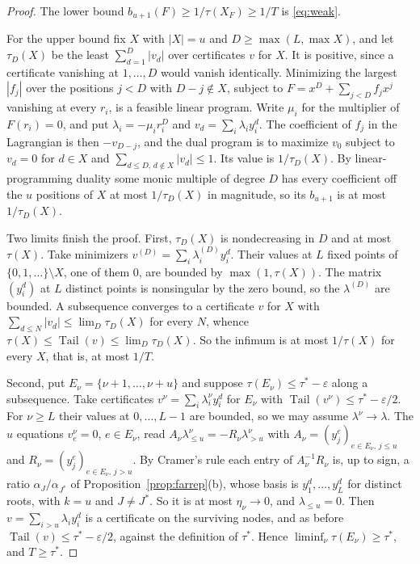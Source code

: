 \documentclass[11pt]{article}
\theoremstyle{definition}
\theoremstyle{plain}
\DeclareMathOperator{\Tail}{Tail}
\begin{document}
\begin{proof}
The lower bound $b_{u+1}(F)\ge1/\tau(X_F)\ge1/T$ is \eqref{eq:weak}.

For the upper bound fix $X$ with $|X|=u$ and $D\ge\max(L,\max X)$, and let
$\tau_D(X)$ be the least $\sum_{d=1}^D|v_d|$ over certificates $v$ for $X$.
It is positive, since a certificate vanishing at $1,\ldots,D$ would vanish
identically.  Minimizing the largest $|f_j|$ over the positions $j<D$ with
$D-j\notin X$, subject to $F=x^D+\sum_{j<D}f_jx^j$ vanishing at every $r_i$,
is a feasible linear program.  Write $\mu_i$ for the multiplier of
$F(r_i)=0$, and put $\lambda_i=-\mu_ir_i^D$ and $v_d=\sum_i\lambda_iy_i^d$.
The coefficient of $f_j$ in the Lagrangian is then $-v_{D-j}$, and the dual
program is to maximize $v_0$ subject to $v_d=0$ for $d\in X$ and
$\sum_{d\le D,\,d\notin X}|v_d|\le1$.  Its value is $1/\tau_D(X)$.  By
linear-programming duality some monic multiple of degree $D$ has every
coefficient off the $u$ positions of $X$ at most $1/\tau_D(X)$ in magnitude,
so its $b_{u+1}$ is at most $1/\tau_D(X)$.

Two limits finish the proof.  First, $\tau_D(X)$ is nondecreasing in $D$ and
at most $\tau(X)$.  Take minimizers $v^{(D)}=\sum_i\lambda^{(D)}_iy_i^d$.
Their values at $L$ fixed points of $\{0,1,\ldots\}\setminus X$, one of them
$0$, are bounded by $\max(1,\tau(X))$.  The matrix $(y_i^d)$ at $L$ distinct
points is nonsingular by the zero bound, so the $\lambda^{(D)}$ are bounded.
A subsequence converges to a certificate $v$ for $X$ with
$\sum_{d\le N}|v_d|\le\lim_D\tau_D(X)$ for every $N$, whence
$\tau(X)\le\Tail(v)\le\lim_D\tau_D(X)$.  So the infimum is at most $1/\tau(X)$
for every $X$, that is, at most $1/T$.

Second, put $E_\nu=\{\nu+1,\ldots,\nu+u\}$ and suppose
$\tau(E_\nu)\le\tau^*-\varepsilon$ along a subsequence.  Take certificates
$v^\nu=\sum_i\lambda^\nu_iy_i^d$ for $E_\nu$ with
$\Tail(v^\nu)\le\tau^*-\varepsilon/2$.  For $\nu\ge L$ their values at
$0,\ldots,L-1$ are bounded, so we may assume $\lambda^\nu\to\lambda$.  The $u$
equations $v^\nu_e=0$, $e\in E_\nu$, read
$A_\nu\lambda^\nu_{\le u}=-R_\nu\lambda^\nu_{>u}$ with
$A_\nu=(y_j^e)_{e\in E_\nu,\,j\le u}$ and
$R_\nu=(y_j^e)_{e\in E_\nu,\,j>u}$.  By Cramer's rule each entry of
$A_\nu^{-1}R_\nu$ is, up to sign, a ratio $\alpha_J/\alpha_{J^*}$ of
Proposition~\ref{prop:farrep}(b), whose basis is $y_1^d,\ldots,y_L^d$ for
distinct roots, with $k=u$ and $J\ne J^*$.  So it is at most $\eta_\nu\to0$, and $\lambda_{\le u}=0$.  Then
$v=\sum_{i>u}\lambda_iy_i^d$ is a certificate on the surviving nodes, and as
before $\Tail(v)\le\tau^*-\varepsilon/2$, against the definition of $\tau^*$.
Hence $\liminf_\nu\tau(E_\nu)\ge\tau^*$, and $T\ge\tau^*$.
\end{proof}
\end{document}
